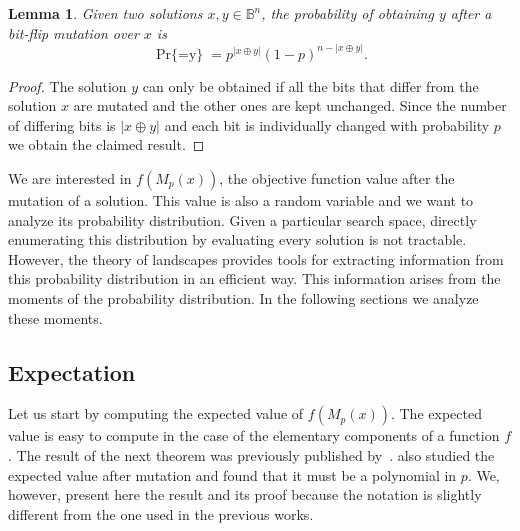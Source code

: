 \documentclass{article}
\newtheorem{lemma}{Lemma}
\newcommand{\Bo}[0]{\mathbb{B}}
\newcommand{\Prob}[1]{\mathop{\mathrm{Pr}\{#1\}}}
\begin{document}
\begin{lemma}
\label{lem:prob-mut}
Given two solutions $x,y \in \Bo^n$, the probability of obtaining $y$ after a bit-flip mutation over $x$ is
\begin{equation}
\label{eqn:prob-mut}
\Prob{M_p(x)=y} = p^{|x\oplus y|}(1-p)^{n-|x\oplus y|}.
\end{equation}
\end{lemma}
\begin{proof}
The solution $y$ can only be obtained if all the bits that differ from the solution $x$ are mutated and the other ones are kept unchanged. Since the number of differing bits is $|x\oplus y|$ and each bit is individually changed with probability $p$ we obtain the claimed result.
\end{proof}

We are interested in $f(M_p(x))$, the objective function value after the mutation of a solution. This value is also a random variable and we want to analyze its probability distribution. 
Given a particular search space, directly enumerating this distribution by evaluating every solution is not tractable. However, the theory of landscapes provides tools for extracting information from this probability distribution in an efficient way. This information arises from the moments of the probability distribution. In the following sections we analyze these moments.

\subsection{Expectation}
\label{subsec:expectation}

Let us start by computing the expected value of $f(M_p(x))$. The expected value is easy to compute in the case of the elementary components of a function $f$. The result of the next theorem was previously published by~\cite{Chicano2011gecco}. \cite{Sutton2011gecco} also studied the expected value after mutation and found that it must be a polynomial in $p$. We, however, present here the result and its proof because the notation is slightly different from the one used in the previous works.
\end{document}
